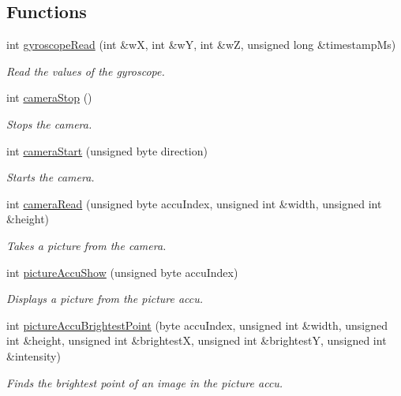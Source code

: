 \subsection*{Functions}
\begin{DoxyCompactItemize}
\item 
int \hyperlink{robot_sensors_8nxc_af5e2727bbc678cc6d885915c51eddbdd}{gyroscope\-Read} (int \&w\-X, int \&w\-Y, int \&w\-Z, unsigned long \&timestamp\-Ms)
\begin{DoxyCompactList}\small\item\em Read the values of the gyroscope. \end{DoxyCompactList}\item 
int \hyperlink{robot_sensors_8nxc_aae11e9e49b19f85f50c7d37aca61c831}{camera\-Stop} ()
\begin{DoxyCompactList}\small\item\em Stops the camera. \end{DoxyCompactList}\item 
int \hyperlink{robot_sensors_8nxc_a36f51b9632c800fbff549614a3be642e}{camera\-Start} (unsigned byte direction)
\begin{DoxyCompactList}\small\item\em Starts the camera. \end{DoxyCompactList}\item 
int \hyperlink{robot_sensors_8nxc_a6d9a2508c7e8dd733a1c7a013855120f}{camera\-Read} (unsigned byte accu\-Index, unsigned int \&width, unsigned int \&height)
\begin{DoxyCompactList}\small\item\em Takes a picture from the camera. \end{DoxyCompactList}\item 
int \hyperlink{robot_sensors_8nxc_a081335606689f22f8871da97f5099eec}{picture\-Accu\-Show} (unsigned byte accu\-Index)
\begin{DoxyCompactList}\small\item\em Displays a picture from the picture accu. \end{DoxyCompactList}\item 
int \hyperlink{robot_sensors_8nxc_abd09e2b68f6e3ca0a6af710ac9db6803}{picture\-Accu\-Brightest\-Point} (byte accu\-Index, unsigned int \&width, unsigned int \&height, unsigned int \&brightest\-X, unsigned int \&brightest\-Y, unsigned int \&intensity)
\begin{DoxyCompactList}\small\item\em Finds the brightest point of an image in the picture accu. \end{DoxyCompactList}\item 

\end{DoxyCompactItemize}
